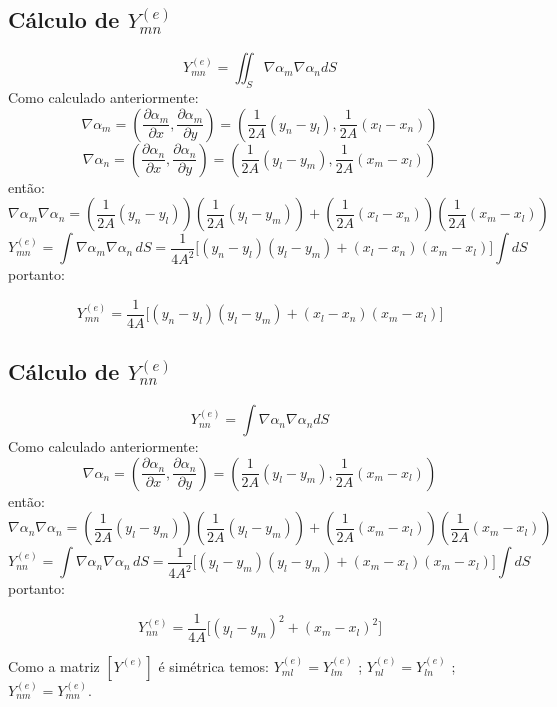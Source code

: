 \documentclass[
12pt,
a4paper,
oneside,
chapter=TITLE,
sumario=tradicional
]{abntex2}
\begin{document}
\subsection*{Cálculo de $Y_{mn}^{(e)}$}

$$ 
\boxed{Y_{mn}^{(e)} = \iint_S \nabla \alpha_m \nabla \alpha_n dS}
$$
Como calculado anteriormente:
$$
\boxed{\nabla \alpha_m = \left( \frac{\partial \alpha_m}{\partial x}, \frac{\partial \alpha_m}{\partial y} \right)
	= \left( \frac{1}{2A}(y_n - y_l), \frac{1}{2A}(x_l - x_n) \right)}
$$
$$
\boxed{\nabla \alpha_n = \left( \frac{\partial \alpha_n}{\partial x}, \frac{\partial \alpha_n}{\partial y} \right)
	= \left( \frac{1}{2A}(y_l - y_m), \frac{1}{2A}(x_m - x_l) \right)}
$$
então:
$$
\nabla \alpha_m \nabla \alpha_n =
\left(\frac{1}{2A}(y_n - y_l)\right)\left(\frac{1}{2A}(y_l - y_m)\right) +
\left(\frac{1}{2A}(x_l - x_n)\right)\left(\frac{1}{2A}(x_m - x_l)\right)
$$
$$
Y_{mn}^{(e)} = \int \nabla \alpha_m \nabla \alpha_n \, dS
= \frac{1}{4A^2} \Big[ (y_n - y_l)(y_l - y_m) + (x_l - x_n)(x_m - x_l) \Big] \int dS
$$
portanto:

\begin{equation}
	\boxed{Y_{mn}^{(e)} = \frac{1}{4A}\Big[(y_n - y_l)(y_l - y_m) + (x_l - x_n)(x_m - x_l)\Big] }
	\label{eq:C_005}
\end{equation}

\subsection*{Cálculo de $Y_{nn}^{(e)}$}

$$ 
\boxed{Y_{nn}^{(e)} = \int \nabla \alpha_n \nabla \alpha_n dS}
$$
Como calculado anteriormente:
$$
\boxed{\nabla \alpha_n = \left( \frac{\partial \alpha_n}{\partial x}, \frac{\partial \alpha_n}{\partial y} \right)
	= \left( \frac{1}{2A}(y_l - y_m), \frac{1}{2A}(x_m - x_l) \right)}
$$
então:
$$
\nabla \alpha_n \nabla \alpha_n =
\left(\frac{1}{2A}(y_l - y_m)\right)\left(\frac{1}{2A}(y_l - y_m)\right) +
\left(\frac{1}{2A}(x_m - x_l)\right)\left(\frac{1}{2A}(x_m - x_l)\right)
$$
$$
Y_{nn}^{(e)} = \int \nabla \alpha_n \nabla \alpha_n \, dS
= \frac{1}{4A^2} \Big[ (y_l - y_m)(y_l - y_m) + (x_m - x_l)(x_m - x_l) \Big] \int dS
$$
portanto:

\begin{equation}
	\boxed{Y_{nn}^{(e)} = \frac{1}{4A}\Big[(y_l - y_m)^2 + (x_m - x_l)^2\Big] }
	\label{eq:C_006}
\end{equation}

Como a matriz $[Y^{(e)}]$ é simétrica temos:  $Y_{ml}^{(e)} = Y_{lm}^{(e)}$ ; $Y_{nl}^{(e)} = Y_{ln}^{(e)}$ ; $Y_{nm}^{(e)} = Y_{mn}^{(e)}$.
\end{document}
